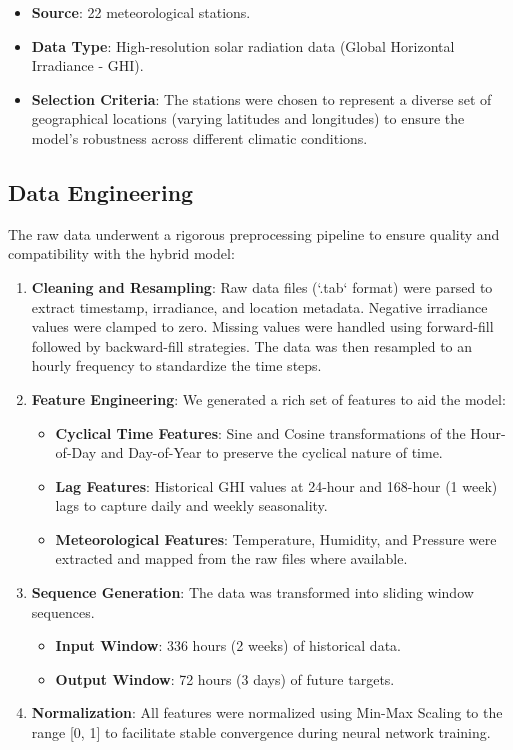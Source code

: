 \documentclass{article}
\begin{document}
\begin{itemize}
    \item \textbf{Source}: 22 meteorological stations.
    \item \textbf{Data Type}: High-resolution solar radiation data (Global Horizontal Irradiance - GHI).
    \item \textbf{Selection Criteria}: The stations were chosen to represent a diverse set of geographical locations (varying latitudes and longitudes) to ensure the model's robustness across different climatic conditions.
\end{itemize}

\subsection{Data Engineering}
The raw data underwent a rigorous preprocessing pipeline to ensure quality and compatibility with the hybrid model:

\begin{enumerate}
    \item \textbf{Cleaning and Resampling}: 
    Raw data files (`.tab` format) were parsed to extract timestamp, irradiance, and location metadata. Negative irradiance values were clamped to zero. Missing values were handled using forward-fill followed by backward-fill strategies. The data was then resampled to an hourly frequency to standardize the time steps.
    
    \item \textbf{Feature Engineering}:
    We generated a rich set of features to aid the model:
    \begin{itemize}
        \item \textbf{Cyclical Time Features}: Sine and Cosine transformations of the Hour-of-Day and Day-of-Year to preserve the cyclical nature of time.
        \item \textbf{Lag Features}: Historical GHI values at 24-hour and 168-hour (1 week) lags to capture daily and weekly seasonality.
        \item \textbf{Meteorological Features}: Temperature, Humidity, and Pressure were extracted and mapped from the raw files where available.
    \end{itemize}
    
    \item \textbf{Sequence Generation}:
    The data was transformed into sliding window sequences.
    \begin{itemize}
        \item \textbf{Input Window}: 336 hours (2 weeks) of historical data.
        \item \textbf{Output Window}: 72 hours (3 days) of future targets.
    \end{itemize}
    
    \item \textbf{Normalization}:
    All features were normalized using Min-Max Scaling to the range [0, 1] to facilitate stable convergence during neural network training.
\end{enumerate}
\end{document}
